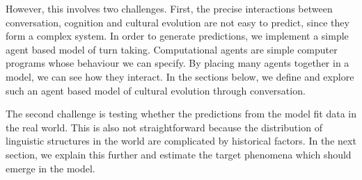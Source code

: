 \documentclass[12pt]{article}
\begin{document}
However, this involves two challenges.  First, the precise interactions between conversation, cognition and cultural evolution are not easy to predict, since they form a complex system.  In order to generate predictions, we implement a simple agent based model of turn taking.  Computational agents are simple computer programs whose behaviour we can specify.  By placing many agents together in a model, we can see how they interact.  In the sections below, we define and explore such an agent based model of cultural evolution through conversation.

The second challenge is testing whether the predictions from the model fit data in the real world.  This is also not straightforward because the distribution of linguistic structures in the world are complicated by historical factors.  In the next section, we explain this further and estimate the target phenomena which should emerge in the model.


%
%
%

%
%
%
%
%
%
\end{document}
